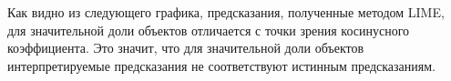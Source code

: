 \documentclass[a4paper, 12pt]{article}
\begin{document}
Как видно из следующего графика, предсказания, полученные методом LIME, для значительной доли объектов отличается с точки зрения косинусного коэффициента. Это значит, что для значительной доли объектов интерпретируемые предсказания не соответствуют истинным предсказаниям.



\end{document}
